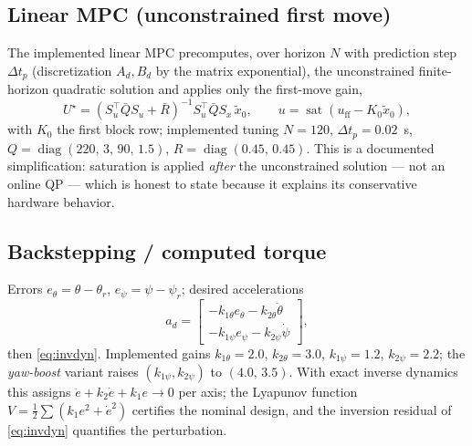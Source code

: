 \documentclass[conference]{IEEEtran}
\newcommand{\sat}{\operatorname{sat}}
\newcommand{\diag}{\operatorname{diag}}
\begin{document}
\subsection{Linear MPC (unconstrained first move)}
The implemented linear MPC precomputes, over horizon $N$ with prediction step $\Delta t_p$ (discretization $A_d, B_d$ by the matrix exponential), the unconstrained finite-horizon quadratic solution and applies only the first-move gain,
\begin{equation}
U^\star = (S_u^{\!\top}\bar Q S_u + \bar R)^{-1} S_u^{\!\top}\bar Q S_x\,\tilde x_0,\qquad
u = \sat(u_{\mathrm{ff}} - K_0\tilde x_0),
\end{equation}
with $K_0$ the first block row; implemented tuning $N = 120$, $\Delta t_p = 0.02$~s, $Q = \diag(220,\,3,\,90,\,1.5)$, $R = \diag(0.45,\,0.45)$. This is a documented simplification: saturation is applied \emph{after} the unconstrained solution --- not an online QP --- which is honest to state because it explains its conservative hardware behavior.

\subsection{Backstepping / computed torque}
Errors $e_\theta = \theta - \theta_r$, $e_\psi = \psi - \psi_r$; desired accelerations
\begin{equation}
a_d = \begin{bmatrix}
-k_{1\theta}e_\theta - k_{2\theta}\dot\theta\\
-k_{1\psi}e_\psi - k_{2\psi}\dot\psi
\end{bmatrix},
\end{equation}
then \eqref{eq:invdyn}. Implemented gains $k_{1\theta}{=}2.0$, $k_{2\theta}{=}3.0$, $k_{1\psi}{=}1.2$, $k_{2\psi}{=}2.2$; the \emph{yaw-boost} variant raises $(k_{1\psi},k_{2\psi})$ to $(4.0,\,3.5)$. With exact inverse dynamics this assigns $\ddot e + k_2\dot e + k_1 e \to 0$ per axis; the Lyapunov function $V = \tfrac12\sum(k_1e^2 + \dot e^2)$ certifies the nominal design, and the inversion residual of \eqref{eq:invdyn} quantifies the perturbation.
\end{document}

